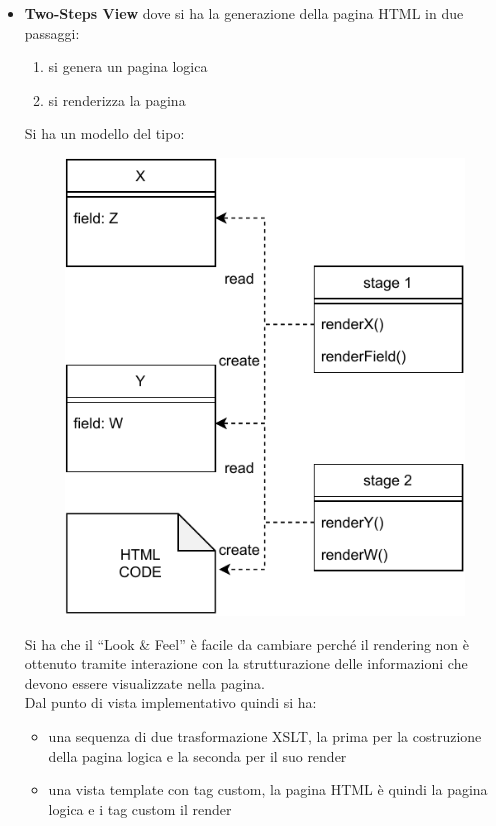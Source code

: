 \documentclass[a4paper,12pt, oneside]{book}
\begin{document}
\begin{itemize}
  \item \textbf{Two-Steps View} dove si ha la generazione della pagina HTML in
  due passaggi:
  \begin{enumerate}
    \item si genera un pagina logica
    \item si renderizza la pagina
  \end{enumerate}
  Si ha un modello del tipo:
   \begin{figure}[H]
    \centering
    \includegraphics[scale = 0.7]{img/mvc9.pdf}
  \end{figure}
  Si ha che il ``Look \& Feel'' è facile da cambiare perché il rendering non è
  ottenuto tramite interazione con la strutturazione delle informazioni che
  devono essere visualizzate nella pagina.\\
  Dal punto di vista implementativo quindi si ha:
  \begin{itemize}
    \item una sequenza di due trasformazione XSLT, la prima per la costruzione
    della pagina logica e la seconda per il suo render
    \item una vista template con tag custom, la pagina HTML è quindi la pagina
    logica e i tag custom il render

\end{itemize}
\end{itemize}
\end{document}
